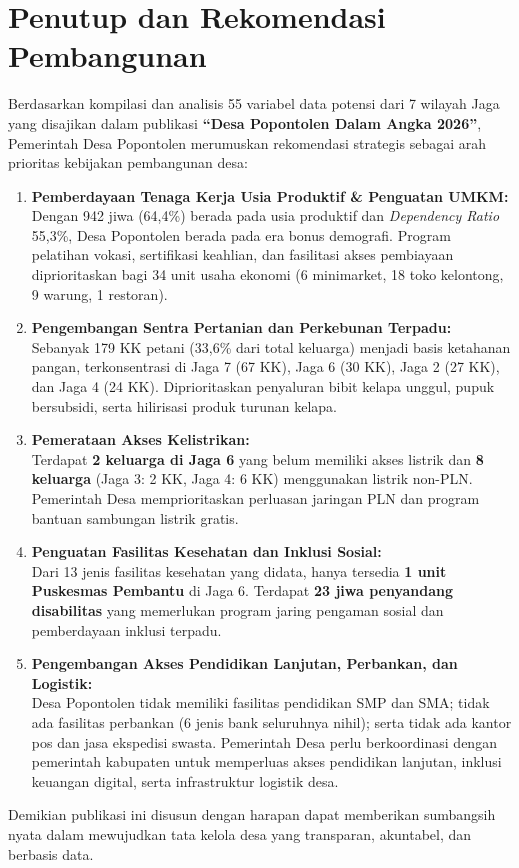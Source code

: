
\section{Penutup dan Rekomendasi Pembangunan}

Berdasarkan kompilasi dan analisis 55 variabel data potensi dari 7 wilayah Jaga yang disajikan dalam publikasi \textbf{``Desa Popontolen Dalam Angka 2026''}, Pemerintah Desa Popontolen merumuskan rekomendasi strategis sebagai arah prioritas kebijakan pembangunan desa:

\begin{enumerate}
  \item \textbf{Pemberdayaan Tenaga Kerja Usia Produktif \& Penguatan UMKM:} \\
  Dengan 942 jiwa (64,4\%) berada pada usia produktif dan \textit{Dependency Ratio} 55,3\%, Desa Popontolen berada pada era bonus demografi. Program pelatihan vokasi, sertifikasi keahlian, dan fasilitasi akses pembiayaan diprioritaskan bagi 34 unit usaha ekonomi (6 minimarket, 18 toko kelontong, 9 warung, 1 restoran).

  \item \textbf{Pengembangan Sentra Pertanian dan Perkebunan Terpadu:} \\
  Sebanyak 179 KK petani (33,6\% dari total keluarga) menjadi basis ketahanan pangan, terkonsentrasi di Jaga 7 (67 KK), Jaga 6 (30 KK), Jaga 2 (27 KK), dan Jaga 4 (24 KK). Diprioritaskan penyaluran bibit kelapa unggul, pupuk bersubsidi, serta hilirisasi produk turunan kelapa.

  \item \textbf{Pemerataan Akses Kelistrikan:} \\
  Terdapat \textbf{2 keluarga di Jaga 6} yang belum memiliki akses listrik dan \textbf{8 keluarga} (Jaga 3: 2 KK, Jaga 4: 6 KK) menggunakan listrik non-PLN. Pemerintah Desa memprioritaskan perluasan jaringan PLN dan program bantuan sambungan listrik gratis.

  \item \textbf{Penguatan Fasilitas Kesehatan dan Inklusi Sosial:} \\
  Dari 13 jenis fasilitas kesehatan yang didata, hanya tersedia \textbf{1 unit Puskesmas Pembantu} di Jaga 6. Terdapat \textbf{23 jiwa penyandang disabilitas} yang memerlukan program jaring pengaman sosial dan pemberdayaan inklusi terpadu.

  \item \textbf{Pengembangan Akses Pendidikan Lanjutan, Perbankan, dan Logistik:} \\
  Desa Popontolen tidak memiliki fasilitas pendidikan SMP dan SMA; tidak ada fasilitas perbankan (6 jenis bank seluruhnya nihil); serta tidak ada kantor pos dan jasa ekspedisi swasta. Pemerintah Desa perlu berkoordinasi dengan pemerintah kabupaten untuk memperluas akses pendidikan lanjutan, inklusi keuangan digital, serta infrastruktur logistik desa.
\end{enumerate}

Demikian publikasi ini disusun dengan harapan dapat memberikan sumbangsih nyata dalam mewujudkan tata kelola desa yang transparan, akuntabel, dan berbasis data.
